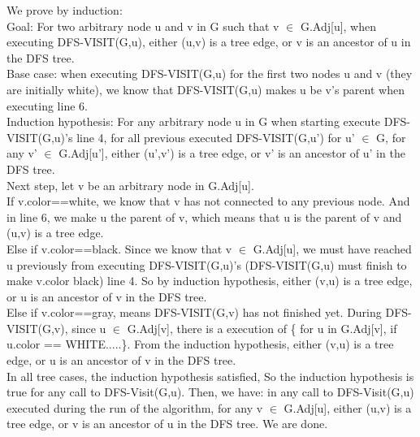 \documentclass{article}
\begin{document}
We prove by induction:\\ 
Goal: For two arbitrary node u and v in G such that v $\in$ G.Adj[u], when executing DFS-VISIT(G,u), either (u,v) is a tree edge, or v is an ancestor of u in the DFS tree.\\
Base case: when executing DFS-VISIT(G,u) for the first two nodes u and v (they are initially white), we know that DFS-VISIT(G,u) makes u be v's parent when executing line 6.\\
Induction hypothesis: For any arbitrary node u in G when starting execute DFS-VISIT(G,u)'s line 4, for all previous executed DFS-VISIT(G,u') for u' $\in$ G, for any v' $\in$ G.Adj[u'], either (u',v') is a tree edge, or v' is an ancestor of u' in the DFS tree.\\
Next step, let v be an arbitrary node in G.Adj[u].\\
If v.color==white, we know that v has not connected to any previous node. And in line 6, we make u the parent of v, which means that u is the parent of v and (u,v) is a tree edge. \\
Else if v.color==black. Since we know that v $\in$ G.Adj[u], we must have reached u previously from executing DFS-VISIT(G,u)'s (DFS-VISIT(G,u) must finish to make v.color black) line 4. So by induction hypothesis, either (v,u) is a tree edge, or u is an ancestor of v in the DFS tree.\\
Else if v.color==gray, means DFS-VISIT(G,v) has not finished yet. During DFS-VISIT(G,v), since u $\in$ G.Adj[v], there is a execution of \{ for u in G.Adj[v], if u.color == WHITE.....\}. From the induction hypothesis, either (v,u) is a tree edge, or u is an ancestor of v in the DFS tree.\\
In all tree cases, the induction hypothesis satisfied, So the induction hypothesis is true for any call to DFS-Visit(G,u). Then, we have: in any call to DFS-Visit(G,u) executed during the run of the algorithm, for any v $\in$ G.Adj[u], either (u,v) is a tree edge, or v is an ancestor of u in the DFS tree. We are done.
\end{document}
